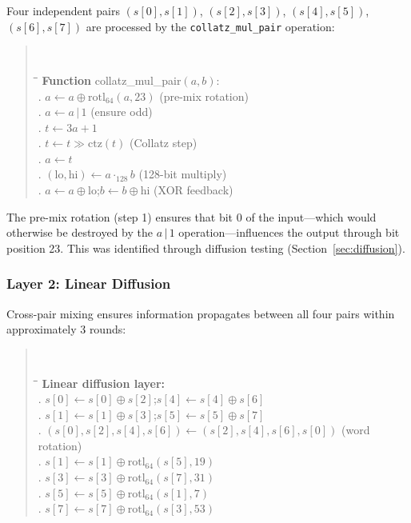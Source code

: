 \documentclass[11pt,a4paper]{article}
\newcommand{\rotl}{\mathrm{rotl}_{64}}
\newcommand{\ctz}{\mathrm{ctz}}
\begin{document}
Four independent pairs $(s[0],s[1])$, $(s[2],s[3])$, $(s[4],s[5])$,
$(s[6],s[7])$ are processed by the \texttt{collatz\_mul\_pair} operation:

\begin{quote}\tt
\begin{tabbing}
\hspace{2em}\=\hspace{2em}\=\kill
\textrm{\textbf{Function}} collatz\_mul\_pair$(a, b)$:\\
. $a \leftarrow a \oplus \rotl(a, 23)$ \textrm{\small (pre-mix rotation)}\\
. $a \leftarrow a \,|\, 1$ \textrm{\small (ensure odd)}\\
. $t \leftarrow 3a + 1$\\
. $t \leftarrow t \gg \ctz(t)$ \textrm{\small (Collatz step)}\\
. $a \leftarrow t$\\
. $(\mathrm{lo}, \mathrm{hi}) \leftarrow a \cdot_{128} b$ \textrm{\small (128-bit multiply)}\\
. $a \leftarrow a \oplus \mathrm{lo}$;\quad $b \leftarrow b \oplus \mathrm{hi}$ \textrm{\small (XOR feedback)}
\end{tabbing}
\end{quote}

The pre-mix rotation (step 1) ensures that bit 0 of the input---which
would otherwise be destroyed by the $a \,|\, 1$ operation---influences
the output through bit position 23. This was identified through
diffusion testing (Section~\ref{sec:diffusion}).

\subsubsection{Layer 2: Linear Diffusion}

Cross-pair mixing ensures information propagates between all four pairs
within approximately 3 rounds:

\begin{quote}\tt
\begin{tabbing}
\hspace{2em}\=\hspace{2em}\=\kill
\textrm{\textbf{Linear diffusion layer:}}\\
. $s[0] \leftarrow s[0] \oplus s[2]$;\quad $s[4] \leftarrow s[4] \oplus s[6]$\\
. $s[1] \leftarrow s[1] \oplus s[3]$;\quad $s[5] \leftarrow s[5] \oplus s[7]$\\
. $(s[0], s[2], s[4], s[6]) \leftarrow (s[2], s[4], s[6], s[0])$ \textrm{\small (word rotation)}\\
. $s[1] \leftarrow s[1] \oplus \rotl(s[5], 19)$\\
. $s[3] \leftarrow s[3] \oplus \rotl(s[7], 31)$\\
. $s[5] \leftarrow s[5] \oplus \rotl(s[1], 7)$\\
. $s[7] \leftarrow s[7] \oplus \rotl(s[3], 53)$
\end{tabbing}
\end{quote}
\end{document}
